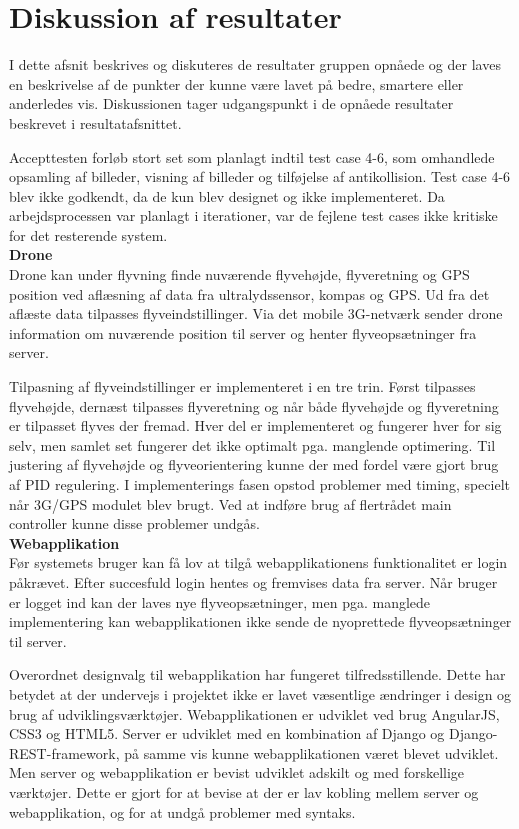 \section{Diskussion af resultater}

I dette afsnit beskrives og diskuteres de resultater gruppen opnåede og der laves en beskrivelse af de punkter der kunne være lavet på bedre, smartere eller anderledes vis. Diskussionen tager udgangspunkt i de opnåede resultater beskrevet i resultatafsnittet.

Accepttesten forløb stort set som planlagt indtil test case 4-6, som omhandlede opsamling af billeder, visning af billeder og tilføjelse af antikollision. Test case 4-6 blev ikke godkendt, da de kun blev designet og ikke implementeret. Da arbejdsprocessen var planlagt i iterationer, var de fejlene test cases ikke kritiske for det resterende system.\\

\textbf{Drone}\\
Drone kan under flyvning finde nuværende flyvehøjde, flyveretning og GPS position ved aflæsning af data fra ultralydssensor, kompas og GPS.  Ud fra det aflæste data tilpasses flyveindstillinger. Via det mobile 3G-netværk sender drone information om nuværende position til server og henter flyveopsætninger fra server.

Tilpasning af flyveindstillinger er implementeret i en tre trin. Først tilpasses flyvehøjde, dernæst tilpasses flyveretning og når både flyvehøjde og flyveretning er tilpasset flyves der fremad. Hver del er implementeret og fungerer hver for sig selv, men samlet set fungerer det ikke optimalt pga. manglende optimering. Til justering af flyvehøjde og flyveorientering kunne der med fordel være gjort brug af PID regulering.  I implementerings fasen opstod problemer med timing, specielt når 3G/GPS modulet blev brugt. Ved at indføre brug af flertrådet main controller kunne disse problemer undgås. \\


\textbf{Webapplikation}\\
Før systemets bruger kan få lov at tilgå webapplikationens funktionalitet er login påkrævet. Efter succesfuld login hentes og fremvises data fra server.
Når bruger er logget ind kan der laves nye flyveopsætninger, men pga. manglede implementering kan webapplikationen ikke sende de nyoprettede flyveopsætninger til server.

Overordnet designvalg til webapplikation har fungeret tilfredsstillende. Dette har betydet at der undervejs i projektet ikke er lavet væsentlige ændringer i design og brug af udviklingsværktøjer. Webapplikationen er udviklet ved brug AngularJS, CSS3 og HTML5. Server er udviklet med en kombination af Django og Django-REST-framework, på samme vis kunne webapplikationen været blevet udviklet. Men server og webapplikation er bevist udviklet adskilt og med forskellige værktøjer. Dette er gjort for at bevise at der er lav kobling mellem server og webapplikation, og for at undgå problemer med syntaks. 

